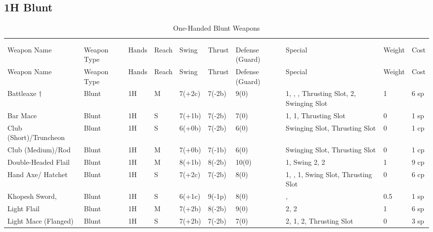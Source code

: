 \documentclass[oneside,11pt,english]{book}
\begin{document}
\subsection{1H Blunt}\vspace{-15pt}
\begin{longtabu} to 1\linewidth {X[2,l]XX[-1,c]X[-1,c]XXX[-1,c]X[2,l]X[-3,c]X[-3,r]}
  \captionsetup{labelformat=blank,textformat=empty}
  \caption{One-Handed Blunt Weapons}\vspace{-15pt}\\
  \label{tab:1H Blunt}\\
  Weapon Name						&Weapon Type	&Hands&Reach&Swing&Thrust&Defense (Guard)&Special						&Weight	&Cost\\\toprule\endfirsthead
  Weapon Name						&Weapon Type	&Hands&Reach&Swing&Thrust&Defense (Guard)&Special						&Weight	&Cost\\\toprule\endhead
  {Battleaxe \hyperref[wep:battleaxe-2h]{$ \dagger $}\label{wep:battleaxe-1h}} &Blunt &1H &M &7(+2c) &7(-2b) &9(0)&  1, , , Thrusting Slot,  2, Swinging Slot &1 &6 sp\\
  Bar Mace &Blunt &1H &S &7(+1b) &7(-2b) &7(0)&  1,  1, Thrusting Slot &0 &1 sp\\
  Club (Short)/Truncheon &Blunt &1H &S &6(+0b) &7(-2b) &6(0)& Swinging Slot, Thrusting Slot &0 &1 cp\\
  Club (Medium)/Rod &Blunt &1H &M &7(+0b) &7(-1b) &6(0)& Swinging Slot, Thrusting Slot &0 &1 cp\\
  Double-Headed Flail &Blunt &1H &M &8(+1b) &8(-2b) &10(0)&  1,  Swing 2,  2 &1 &9 cp\\
  Hand Axe/ Hatchet &Blunt &1H &S &7(+2c) &7(-2b) &8(0)&  1, ,  1, Swing Slot, Thrusting Slot &0 &6 cp\\
  Khopesh Sword, &Blunt &1H &S &6(+1c) &9(-1p) &8(0)& ,  &0.5 &1 sp\\
  Light Flail &Blunt &1H &M &7(+2b) &8(-2b) &9(0)&  2,  2 &1 &6 sp\\
  Light Mace (Flanged) &Blunt &1H &S &7(+2b) &7(-2b) &7(0)&  2,  1,  2, Thrusting Slot &0 &3 sp\\

\end{longtabu}
\end{document}
